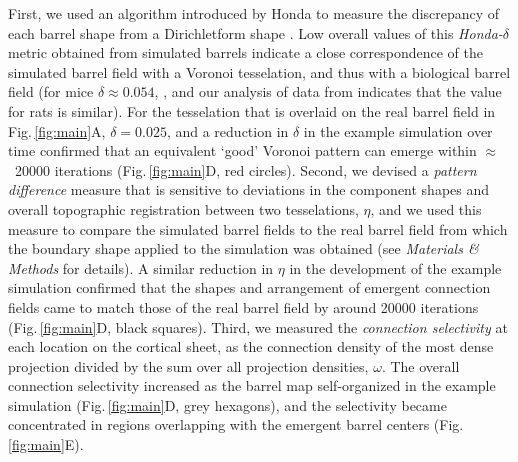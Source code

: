 \documentclass[9pt,lineno]{elife}
\newcommand{\cmnt}[1]{\textcolor{colcmnt}{#1}}
\begin{document}
\cmnt{First, we used an algorithm introduced by Honda to measure the
  discrepancy of each barrel shape from a Dirichletform shape}
\citep{honda_geometrical_1983}.  \cmnt{Low overall values of this
  \emph{Honda-}$\delta$ metric obtained from simulated barrels indicate a
  close correspondence of the simulated barrel field with a Voronoi
  tesselation, and thus with a biological barrel field
  (for mice $\delta\approx0.054$,} \citealp{senft_mouse_1991}\cmnt{, and
  our analysis of data from} \citealp{zheng_signal_2001} \cmnt{ indicates that
  the value for rats is similar). For the tesselation
  that is overlaid on the real barrel field in Fig.\,\ref{fig:main}A,
  $\delta=0.025$, and a reduction in $\delta$ in the example simulation over
  time confirmed that an equivalent `good' Voronoi pattern can emerge
  within $\approx$~20000
  iterations (Fig.\,\ref{fig:main}D, red circles). Second, we devised a
  \emph{pattern difference} measure that is sensitive to deviations in the
  component shapes and overall topographic registration between two
  tesselations, $\eta$, and we used this measure to compare the simulated
  barrel fields to the real barrel field from which the boundary shape applied
  to the simulation was obtained (see \emph{Materials \& Methods} for
  details). A similar reduction in $\eta$ in the development of the example
  simulation confirmed that the shapes and arrangement of emergent connection
  fields came to match those of the real barrel field by around 20000
  iterations (Fig.\,\ref{fig:main}D, black squares). Third, we measured the
  \emph{connection selectivity} at each location on the cortical sheet, as the
  connection density of the most dense projection divided by the sum over all
  projection densities, $\omega$. The overall connection selectivity increased as the
  barrel map self-organized in the example simulation (Fig.\,\ref{fig:main}D,
  grey hexagons), and the selectivity became concentrated in regions
  overlapping with the emergent barrel centers (Fig.\,\ref{fig:main}E).}
\end{document}
